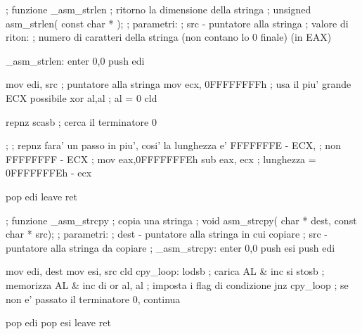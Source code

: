\begin{AsmCodeListing}[label=memory.asm]
; funzione _asm_strlen
; ritorno la dimensione della stringa
; unsigned asm_strlen( const char * );
; parametri:
;   src - puntatore alla stringa
; valore di riton:
;   numero di caratteri della stringa (non contano lo 0 finale) (in EAX)

_asm_strlen:
        enter   0,0
        push    edi

        mov     edi, src        ; puntatore alla stringa
        mov     ecx, 0FFFFFFFFh ; usa il piu' grande ECX possibile
        xor     al,al           ; al = 0
        cld

        repnz   scasb           ; cerca il terminatore 0

;
; repnz fara' un passo in piu', cosi' la lunghezza e' FFFFFFFE - ECX,
; non FFFFFFFF - ECX
;
        mov     eax,0FFFFFFFEh
        sub     eax, ecx        ; lunghezza = 0FFFFFFFEh - ecx

        pop     edi
        leave
        ret

; funzione _asm_strcpy
; copia una stringa
; void asm_strcpy( char * dest, const char * src);
; parametri:
;   dest - puntatore alla stringa in cui copiare
;   src  - puntatore alla stringa da copiare
; 
_asm_strcpy:
        enter   0,0
        push    esi
        push    edi

        mov     edi, dest
        mov     esi, src
        cld
cpy_loop:
        lodsb                   ; carica AL & inc si
        stosb                   ; memorizza AL & inc di
        or      al, al          ; imposta i flag di condizione
        jnz     cpy_loop        ; se non e' passato il terminatore 0, continua

        pop     edi
        pop     esi
        leave
        ret
\end{AsmCodeListing}

